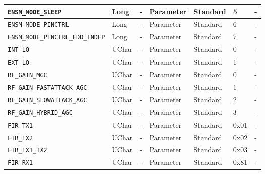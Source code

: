 \documentclass{article}
\begin{document}
\begin{landscape}
\begin{scriptsize}
\begin{longtable}{|p{3.6cm}|p{8.1cm}|p{1.4cm}|p{1.3cm}|p{1.4cm}|p{2.5cm}|p{3.6cm}|}
			\hline
      \verb+ENSM_MODE_SLEEP+           & Long         & -               & Parameter             & Standard                         & 5                   & - \\
			\hline
      \verb+ENSM_MODE_PINCTRL+         & Long         & -               & Parameter             & Standard                         & 6                   & - \\
			\hline
      \verb+ENSM_MODE_PINCTRL_FDD_INDEP+&Long         & -               & Parameter             & Standard                         & 7                   & - \\
			\hline
      \verb+INT_LO+                    & UChar        & -               & Parameter             & Standard                         & 0                   & - \\
			\hline
      \verb+EXT_LO+                    & UChar        & -               & Parameter             & Standard                         & 1                   & - \\
			\hline
      \verb+RF_GAIN_MGC+               & UChar        & -               & Parameter             & Standard                         & 0                   & - \\
			\hline
      \verb+RF_GAIN_FASTATTACK_AGC+    & UChar        & -               & Parameter             & Standard                         & 1                   & - \\
			\hline
      \verb+RF_GAIN_SLOWATTACK_AGC+    & UChar        & -               & Parameter             & Standard                         & 2                   & - \\
			\hline
      \verb+RF_GAIN_HYBRID_AGC+        & UChar        & -               & Parameter             & Standard                         & 3                   & - \\
			\hline
      \verb+FIR_TX1+                   & UChar        & -               & Parameter             & Standard                         & 0x01                & - \\
			\hline
      \verb+FIR_TX2+                   & UChar        & -               & Parameter             & Standard                         & 0x02                & - \\
			\hline
      \verb+FIR_TX1_TX2+               & UChar        & -               & Parameter             & Standard                         & 0x03                & - \\
			\hline
      \verb+FIR_RX1+                   & UChar        & -               & Parameter             & Standard                         & 0x81                & - \\

\end{longtable}
\end{scriptsize}
\end{landscape}
\end{document}
